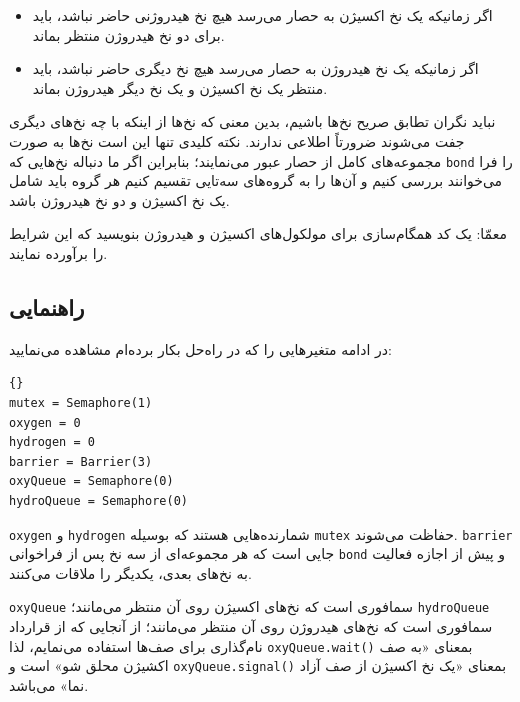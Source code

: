\documentclass{book}
\newcommand{\clearemptydoublepage}{}%
\begin{document}
\begin{itemize}

\item
    اگر زمانیکه یک نخ اکسیژن به حصار می‌رسد هیچ نخ‌ هیدروژنی حاضر نباشد، باید برای دو نخ هیدروژن منتظر بماند. 

\item 
    اگر زمانیکه یک نخ هیدروژن به حصار می‌رسد هیچ نخ دیگری حاضر نباشد، باید منتظر یک نخ  اکسیژن و یک نخ دیگر هیدروژن بماند. 
\end{itemize}

    نباید نگران تطابق صریح نخ‌ها باشیم،‌ بدین معنی که نخ‌ها  از اینکه با چه نخ‌های دیگری جفت می‌شوند ضرورتاً  اطلاعی ندارند. نکته کلیدی تنها این است 
    نخ‌ها به صورت مجموعه‌های کامل از حصار عبور می‌نمایند؛ بنابراین اگر ما دنباله نخ‌هایی که {\tt bond} را فرا می‌خوانند بررسی کنیم و آن‌ها را به گروه‌های 
    سه‌تایی تقسیم کنیم هر گروه باید شامل یک نخ اکسیژن و دو نخ هیدروژن باشد. 

    معمّا:‌ یک کد همگام‌سازی برای مولکول‌های اکسیژن و هیدروژن بنویسید که این شرایط را برآورده نمایند. 


\clearemptydoublepage
\subsection {راهنمایی }

    در ادامه متغیرهایی را که در راه‌حل بکار برده‌ام مشاهده می‌نمایید:

\begin{latin}
\begin{lstlisting}[title=\rl{راهنمایی ساخت آب}]{}
mutex = Semaphore(1)
oxygen = 0
hydrogen = 0
barrier = Barrier(3)
oxyQueue = Semaphore(0)
hydroQueue = Semaphore(0)
\end{lstlisting}
\end{latin}

    {\tt oxygen} و {\tt hydrogen} شمارنده‌هایی هستند که بوسیله {\tt mutex} حفاظت می‌شوند. {\tt barrier} 
    جایی است که هر مجموعه‌ای از سه نخ پس از فراخوانی {\tt bond} و پیش از اجازه فعالیت به نخ‌های بعدی، یکدیگر را ملاقات می‌کنند. 
    

    {\tt oxyQueue} سمافوری است که نخ‌های اکسیژن روی آن منتظر می‌مانند؛ 
    {\tt hydroQueue} سمافوری است که نخ‌های هیدروژن روی آن منتظر می‌مانند؛ 
    از آنجایی که از قرارداد نام‌گذاری برای صف‌ها استفاده می‌نمایم، لذا {\tt oxyQueue.wait()} بمعنای «به صف اکشیژن محلق شو» است 
    و {\tt oxyQueue.signal()} بمعنای «یک نخ اکسیژن از صف آزاد نما» می‌باشد. 


\clearemptydoublepage
\end{document}
